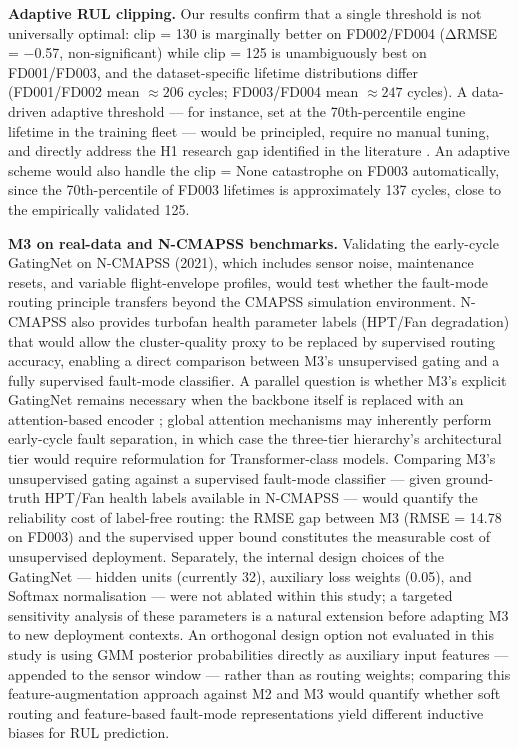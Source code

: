 \documentclass[review,12pt]{elsarticle}
\begin{document}
\textbf{Adaptive RUL clipping.} Our results confirm that a single threshold is not universally optimal: clip = 130 is marginally better on FD002/FD004 (ΔRMSE = −0.57, non-significant) while clip = 125 is unambiguously best on FD001/FD003, and the dataset-specific lifetime distributions differ (FD001/FD002 mean $\approx 206$ cycles; FD003/FD004 mean $\approx 247$ cycles). A data-driven adaptive threshold — for instance, set at the 70th-percentile engine lifetime in the training fleet — would be principled, require no manual tuning, and directly address the H1 research gap identified in the literature \cite{ref18,ref20}. An adaptive scheme would also handle the clip = None catastrophe on FD003 automatically, since the 70th-percentile of FD003 lifetimes is approximately 137 cycles, close to the empirically validated 125.

\textbf{M3 on real-data and N-CMAPSS benchmarks.} Validating the early-cycle GatingNet on N-CMAPSS (2021), which includes sensor noise, maintenance resets, and variable flight-envelope profiles, would test whether the fault-mode routing principle transfers beyond the CMAPSS simulation environment. N-CMAPSS also provides turbofan health parameter labels (HPT/Fan degradation) that would allow the cluster-quality proxy to be replaced by supervised routing accuracy, enabling a direct comparison between M3's unsupervised gating and a fully supervised fault-mode classifier. A parallel question is whether M3's explicit GatingNet remains necessary when the backbone itself is replaced with an attention-based encoder \cite{ref08,ref11,ref13,ref14}; global attention mechanisms may inherently perform early-cycle fault separation, in which case the three-tier hierarchy's architectural tier would require reformulation for Transformer-class models. Comparing M3's unsupervised gating against a supervised fault-mode classifier --- given ground-truth HPT/Fan health labels available in N-CMAPSS --- would quantify the reliability cost of label-free routing: the RMSE gap between M3 (RMSE = 14.78 on FD003) and the supervised upper bound constitutes the measurable cost of unsupervised deployment. Separately, the internal design choices of the GatingNet --- hidden units (currently 32), auxiliary loss weights (0.05), and Softmax normalisation --- were not ablated within this study; a targeted sensitivity analysis of these parameters is a natural extension before adapting M3 to new deployment contexts. An orthogonal design option not evaluated in this study is using GMM posterior probabilities directly as auxiliary input features --- appended to the sensor window --- rather than as routing weights; comparing this feature-augmentation approach against M2 and M3 would quantify whether soft routing and feature-based fault-mode representations yield different inductive biases for RUL prediction.
\end{document}
